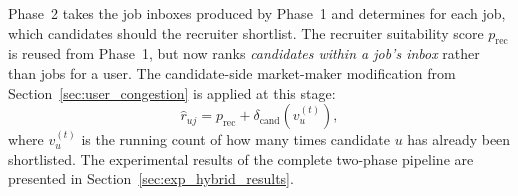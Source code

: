 Phase~2 takes the job inboxes produced by Phase~1 and determines for each job, which
candidates should the recruiter shortlist. The recruiter suitability
score $p_{\text{rec}}$ is reused from Phase~1, but now ranks
\emph{candidates within a job's inbox} rather than jobs for a user.
The candidate-side market-maker modification from
Section~\ref{sec:user_congestion} is applied at this stage:
\begin{equation}
    \hat{r}_{uj} = p_{\text{rec}} +
    \delta_{\text{cand}}\!\left(v_u^{(t)}\right),
\end{equation}
where $v_u^{(t)}$ is the running count of how many times candidate $u$
has already been shortlisted. The experimental results of the complete two-phase pipeline are presented in Section~\ref{sec:exp_hybrid_results}.